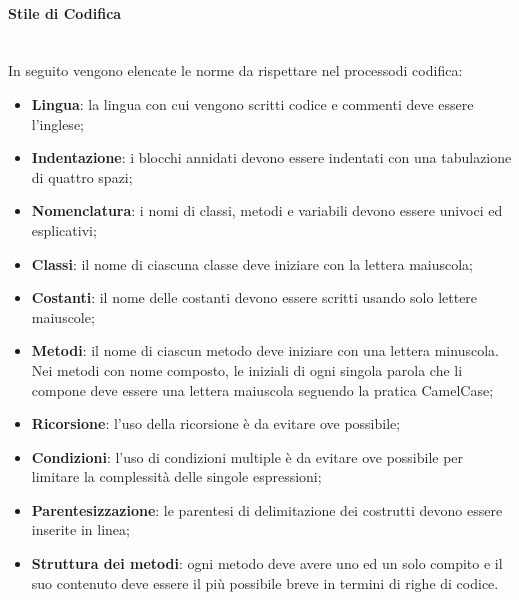 \paragraph*{Stile di Codifica}\mbox{}\\ [1mm]
In seguito vengono elencate le norme da rispettare nel processo\glosp di codifica:
\begin{itemize}
	\item \textbf{Lingua}: la lingua con cui vengono scritti codice e commenti deve essere l'inglese;
	\item \textbf{Indentazione}: i blocchi annidati devono essere indentati con una tabulazione di quattro spazi;
	\item \textbf{Nomenclatura}: i nomi di classi, metodi e variabili devono essere univoci ed esplicativi;
	\item \textbf{Classi}: il nome di ciascuna classe deve iniziare con la lettera maiuscola; 
	\item \textbf{Costanti}: il nome delle costanti devono essere scritti usando solo lettere maiuscole;
	\item \textbf{Metodi}: il nome di ciascun metodo deve iniziare con una lettera minuscola. Nei metodi con nome composto, le iniziali di ogni singola parola che li compone deve essere una lettera maiuscola seguendo la pratica CamelCase;
	\item \textbf{Ricorsione}: l'uso della ricorsione è da evitare ove possibile;
	\item \textbf{Condizioni}: l'uso di condizioni multiple è da evitare ove possibile per limitare la complessità delle singole espressioni;
	\item \textbf{Parentesizzazione}: le parentesi di delimitazione dei costrutti devono essere inserite in linea;
	\item \textbf{Struttura dei metodi}: ogni metodo deve avere uno ed un solo compito e il suo contenuto deve essere il più possibile breve in termini di righe di codice.
\end{itemize}
